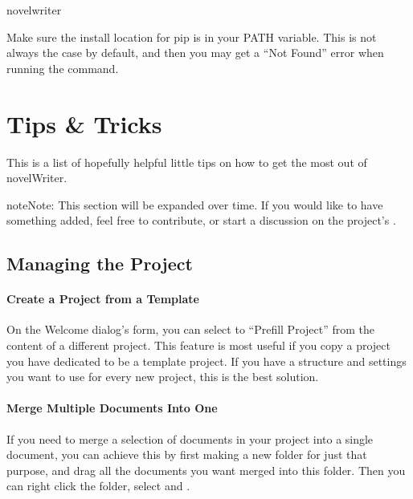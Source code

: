 \documentclass[a4paper,11pt,english]{sphinxmanual}
\begin{document}
\begin{sphinxVerbatim}[commandchars=\\\{\}]
novelwriter
\end{sphinxVerbatim}

\sphinxAtStartPar
Make sure the install location for pip is in your PATH variable. This is not always the case by
default, and then you may get a “Not Found” error when running the  command.

\sphinxstepscope


\chapter{Tips \& Tricks}
\label{\detokenize{int_howto:tips-tricks}}\label{\detokenize{int_howto:a-howto}}\label{\detokenize{int_howto::doc}}
\sphinxAtStartPar
This is a list of hopefully helpful little tips on how to get the most out of novelWriter.

\begin{sphinxadmonition}{note}{Note:}
\sphinxAtStartPar
This section will be expanded over time. If you would like to have something added, feel free to
contribute, or start a discussion on the project’s .
\end{sphinxadmonition}


\section{Managing the Project}
\label{\detokenize{int_howto:managing-the-project}}\subsubsection*{Create a Project from a Template}

\sphinxAtStartPar
On the Welcome dialog’s  form, you can select to “Prefill Project” from
the content of a different project. This feature is most useful if you copy a project you have
dedicated to be a template project. If you have a structure and settings you want to use for
every new project, this is the best solution.
\subsubsection*{Merge Multiple Documents Into One}

\sphinxAtStartPar
If you need to merge a selection of documents in your project into a single document, you can
achieve this by first making a new folder for just that purpose, and drag all the documents you
want merged into this folder. Then you can right click the folder, select 
and .
\end{document}
